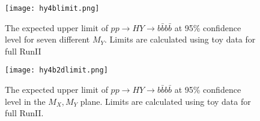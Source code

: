  \begin{figure} %
    \centering
    \texttt{[image: hy4blimit.png]}
    \caption{The expected upper limit of $pp \rightarrow HY \rightarrow b\bar{b} b\bar{b}$ at 95\% confidence level for seven different $M_Y$. Limits are calculated using toy data for full RunII}
    \label{fig:hy4blimit}
 \end{figure}

 \begin{figure} %
    \centering
    \texttt{[image: hy4b2dlimit.png]}
    \caption{The expected upper limit of $pp \rightarrow HY \rightarrow b\bar{b} b\bar{b}$ at 95\% confidence level in the $M_X, M_Y$ plane. Limits are calculated using toy data for full RunII.}
    \label{fig:hy4b2dlimit}
 \end{figure}